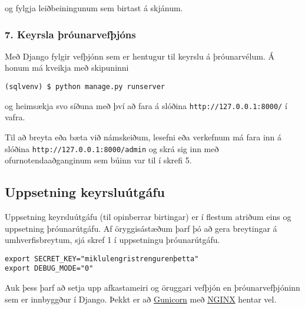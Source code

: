 og fylgja leiðbeiningunum sem birtast á skjánum.

\subsubsection{7. Keyrsla
þróunarvefþjóns}\label{keyrsla-uxferuxf3unarvefuxfejuxf3ns}

Með Django fylgir vefþjónn sem er hentugur til keyrslu á þróunarvélum. Á
honum má kveikja með skipuninni

\begin{verbatim}
(sqlvenv) $ python manage.py runserver
\end{verbatim}

og heimsækja svo síðuna með því að fara á slóðina
\texttt{http://127.0.0.1:8000/} í vafra.

Til að breyta eða bæta við námskeiðum, lesefni eða verkefnum má fara inn
á slóðina \texttt{http://127.0.0.1:8000/admin} og skrá sig inn með
ofurnotendaaðganginum sem búinn var til í skrefi 5.

\subsection*{Uppsetning
keyrsluútgáfu}\label{uppsetning-keyrsluuxfatguxe1fu}

Uppsetning keyrsluútgáfu (til opinberrar birtingar) er í flestum atriðum
eins og uppsetning þróunarútgáfu. Af öryggisástæðum þarf þó að gera
breytingar á umhverfisbreytum, sjá skref 1 í uppsetningu þróunarútgáfu.

\begin{verbatim}
export SECRET_KEY="miklulengristrengurenþetta"
export DEBUG_MODE="0"
\end{verbatim}

Auk þess þarf að setja upp afkastameiri og öruggari vefþjón en þróunarvefþjóninn sem er innbyggður í Django.
Þekkt er að \href{http://gunicorn.org/}{Gunicorn} með \href{https://www.nginx.com/}{NGINX} hentar vel.